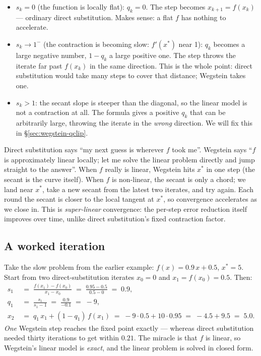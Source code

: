 \documentclass[11pt,a4paper]{article}
\begin{document}
\begin{itemize}[leftmargin=*,nosep,topsep=2pt]
  \item $s_k = 0$ (the function is locally flat): $q_k = 0$.
        The step becomes $x_{k+1} = f(x_k)$ --- ordinary direct
        substitution.  Makes sense: a flat $f$ has nothing to
        accelerate.
  \item $s_k \to 1^{-}$ (the contraction is becoming slow:
        $f'(x^{\!*})$ near 1): $q_k$ becomes a large negative
        number, $1 - q_k$ a large positive one.  The step throws
        the iterate far past $f(x_k)$ in the same direction.
        This is the whole point: direct substitution would take
        many steps to cover that distance; Wegstein takes one.
  \item $s_k > 1$: the secant slope is steeper than the diagonal,
        so the linear model is not a contraction at all.  The
        formula gives a positive $q_k$ that can be arbitrarily
        large, throwing the iterate in the \emph{wrong} direction.
        We will fix this in \S\ref{sec:wegstein-qclip}.
\end{itemize}

\begin{intuition}
Direct substitution says ``my next guess is wherever $f$ took me''.
Wegstein says ``$f$ is approximately linear locally; let me solve
the linear problem directly and jump straight to the answer''.
When $f$ really is linear, Wegstein hits $x^{\!*}$ in one step
(the secant is the curve itself).  When $f$ is non-linear, the
secant is only a chord; we land near $x^{\!*}$, take a new
secant from the latest two iterates, and try again.  Each round
the secant is closer to the local tangent at $x^{\!*}$, so
convergence accelerates as we close in.  This is \emph{super-linear}
convergence: the per-step error reduction itself improves over
time, unlike direct substitution's fixed contraction factor.
\end{intuition}

\subsection{A worked iteration}

Take the slow problem from the earlier example: $f(x) = 0.9\,x + 0.5$,
$x^{\!*} = 5$.  Start from two direct-substitution iterates
$x_0 = 0$ and $x_1 = f(x_0) = 0.5$.  Then:
\begin{align*}
   s_1 \;&=\; \frac{f(x_1) - f(x_0)}{x_1 - x_0}
            \;=\; \frac{0.95 - 0.5}{0.5 - 0}
            \;=\; 0.9, \\[2pt]
   q_1 \;&=\; \frac{s_1}{s_1 - 1}
            \;=\; \frac{0.9}{-0.1}
            \;=\; -9, \\[2pt]
   x_2 \;&=\; q_1\,x_1 + (1 - q_1)\,f(x_1)
            \;=\; -9 \cdot 0.5 + 10 \cdot 0.95
            \;=\; -4.5 + 9.5
            \;=\; 5.0.
\end{align*}
\emph{One} Wegstein step reaches the fixed point exactly --- whereas
direct substitution needed thirty iterations to get within $0.21$.
The miracle is that $f$ is linear, so Wegstein's linear model is
\emph{exact}, and the linear problem is solved in closed form.
\end{document}
